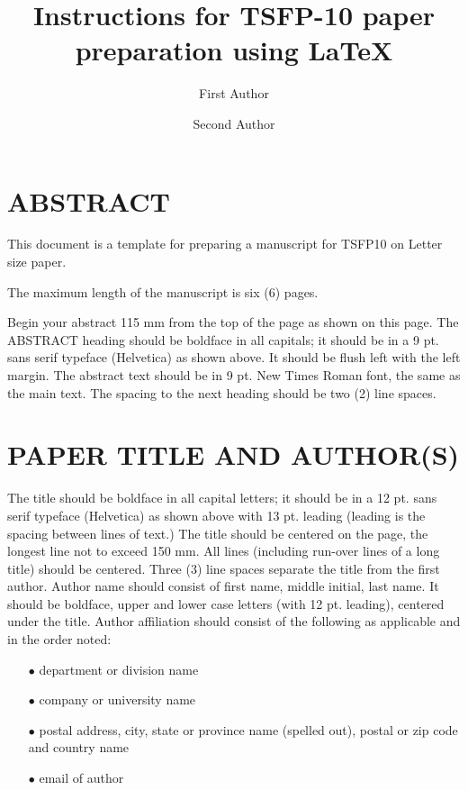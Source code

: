 \documentclass[twocolumn,10pt]{tsfp}
\title{Instructions for TSFP-10 paper preparation using \LaTeX}
\author{First Author
    \affiliation{
	Department of ...\\
	Organization/University\\
	Address\\
    email
    }	
}
\author{Second Author
          \affiliation{Department of ...\\
	Organixation/University\\
	Address\\
	email
    }
}
\begin{document}
\maketitle   %

\fontsize{9}{11}\selectfont

\section*{ABSTRACT}

This document is a template for preparing a manuscript for TSFP10 on Letter size paper.

The maximum length of the manuscript is six (6) pages.

Begin your abstract 115 mm from the top of the page as shown on this page. The ABSTRACT heading should be boldface in all capitals; it should be in a 9 pt. sans serif typeface (Helvetica) as shown above. It should be flush left with the left margin. The abstract text should be in 9 pt. New Times Roman font, the same as the main text. The spacing to the next heading should be two (2) line spaces.

\section*{PAPER TITLE AND AUTHOR(S)}

The title should be boldface in all capital letters; it should be in a 12 pt. sans serif typeface (Helvetica) as shown above with 13 pt. leading (leading is the spacing between lines of text.) The title should be centered on the page, the longest line not to exceed 150 mm. All lines (including run-over lines of a long title) should be centered. Three (3) line spaces separate the title from the first author. Author name should consist of first name, middle initial, last name. It should be boldface, upper and lower case letters (with 12 pt. leading), centered under the title. Author affiliation should consist of the following as applicable and in the order noted:

\begin{itemize}
\item[$\bullet$] department or division name
\item[$\bullet$] company or university name
\item[$\bullet$] postal address, city, state or province name (spelled out), postal or zip code and country name
\item[$\bullet$] email of author
\end{itemize}
\end{document}
